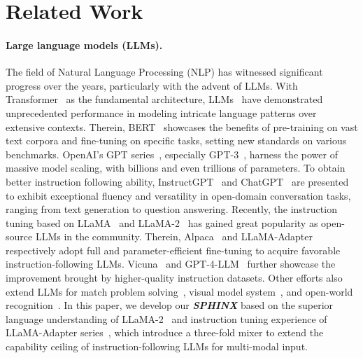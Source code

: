 \documentclass{article} \usepackage{iclr2024_conference,times}
\begin{document}
\section{Related Work}
\paragraph{Large language models (LLMs).}
The field of Natural Language Processing (NLP) has witnessed significant progress over the years, particularly with the advent of LLMs. With Transformer~\citep{Vaswani2017AttentionIA} as the fundamental architecture, LLMs~\citep{OpenAI2023ChatGPT,radford2019language,OpenAI2023GPT4TR} have demonstrated unprecedented performance in modeling intricate language patterns over extensive contexts. Therein, BERT~\citep{Devlin2019BERTPO} showcases the benefits of pre-training on vast text corpora and fine-tuning on specific tasks, setting new standards on various benchmarks.
OpenAI's GPT series~\citep{Radford2018ImprovingLU,radford2019language,OpenAI2023ChatGPT,OpenAI2023GPT4TR}, especially GPT-3~\citep{brown2020language}, harness the power of massive model scaling, with billions and even trillions of parameters. To obtain better instruction following ability, InstructGPT~\citep{Ouyang2022TrainingLM} and ChatGPT~\citep{OpenAI2023ChatGPT} are presented to exhibit exceptional fluency and versatility in open-domain conversation tasks,  ranging from text generation to question answering. Recently, the instruction tuning based on LLaMA~\citep{touvron2023llama} and LLaMA-2~\citep{Touvron2023Llama2O} has gained great popularity as open-source LLMs in the community. Therein, Alpaca~\citep{alpaca} and LLaMA-Adapter~\citep{zhang2023llama} respectively adopt full and parameter-efficient fine-tuning to acquire favorable instruction-following LLMs. Vicuna~\citep{vicuna2023} and GPT-4-LLM~\citep{gpt4llm} further showcase the improvement brought by higher-quality instruction datasets. Other efforts also extend LLMs for match problem solving~\citep{wang2023mathcoder,zhou2023solving}, visual model system~\citep{wu2023visual,yang2023mm}, and open-world recognition~\citep{zhang2023prompt,zhu2022pointclip}. In this paper, we develop our \textcolor{Goldenrod3}{\textbf{\textit{SPHINX}}} based on the superior language understanding of LLaMA-2~\citep{Touvron2023Llama2O} and instruction tuning experience of LLaMA-Adapter series~\citep{zhang2023llama,gao2023llama}, which introduce a three-fold mixer to extend the capability ceiling of instruction-following LLMs for multi-modal input.
\end{document}

